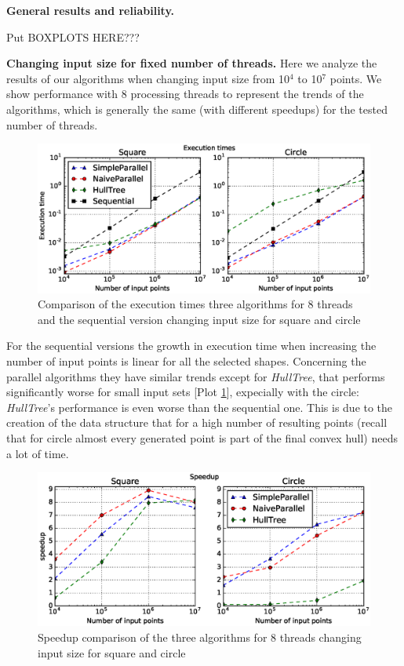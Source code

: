 \documentclass[letterpaper]{article}
\newcommand{\mypar}[1]{{\bf #1.}}
\theoremstyle{definition}
\begin{document}
\mypar{General results and reliability}

Put BOXPLOTS HERE???

\mypar{Changing input size for fixed number of threads}
Here we analyze the results of our algorithms when changing input size from 10$^4$ to 10$^7$ points. We show performance with 8 processing threads to represent the trends of the algorithms, which is generally the same (with different speedups) for the tested number of threads.

\begin{figure}[!ht]\centering
  \includegraphics[scale=0.33]{./plots/time_points.eps}
  \caption{Comparison of the execution times three algorithms for 8 threads and the sequential version changing input size for square and circle\label{Input size time}}
\end{figure}

For the sequential versions the growth in execution time when increasing the number of input points is linear for all the selected shapes.
Concerning the parallel algorithms they have similar trends except for \textit{HullTree}, that performs significantly worse for small input sets [Plot \ref{Input size time}], expecially with the circle: \textit{HullTree}'s performance is even worse than the sequential one.
This is due to the creation of the data structure that for a high number of resulting points (recall that for circle almost every generated point is part of the final convex hull) needs a lot of time.

\begin{figure}[!ht]\centering
  \includegraphics[scale=0.33]{./plots/speedup_points.eps}
  \caption{Speedup comparison of the three algorithms for 8 threads changing input size for square and circle\label{Input size speedup}}
\end{figure}
\end{document}
